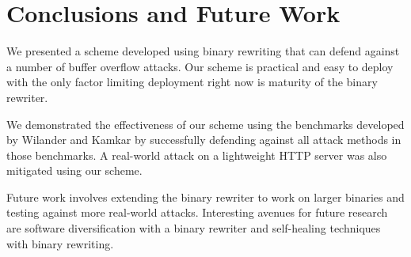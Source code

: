 
\renewcommand{\thechapter}{5}

\chapter{Conclusions and Future Work}

We presented a scheme developed using binary rewriting that can defend against a number of buffer
overflow attacks. Our scheme is practical and easy to deploy with the only factor limiting
deployment right now is maturity of the binary rewriter.

We demonstrated the effectiveness of our scheme using the benchmarks developed by Wilander and
Kamkar by successfully defending against all attack methods in those benchmarks. A real-world attack
 on a lightweight HTTP server was also mitigated using our scheme.

Future work involves extending the binary rewriter to work on larger binaries and testing against
more real-world attacks. Interesting avenues for future research are software diversification with
a binary rewriter and self-healing techniques with binary rewriting.
